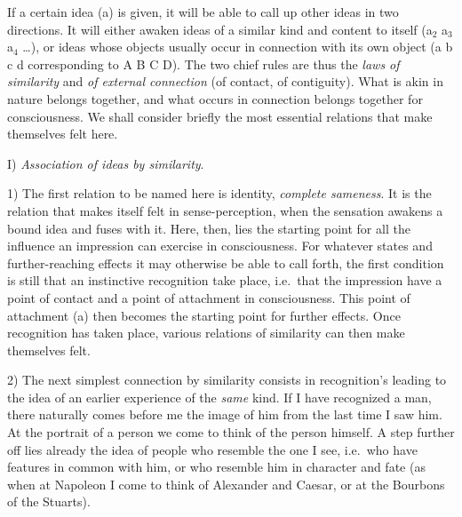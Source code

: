 \documentclass[12pt,a4paper]{book}
\newcommand{\opage}[1]{\marginnote{\footnotesize\textit{[#1]}}}
\begin{document}
If a certain idea (a) is given, it will be able to call up other ideas in
two directions. It will either awaken ideas of a similar kind and content
to itself (a$_{2}$ a$_{3}$ a$_{4}$ \ldots), or ideas whose objects usually
occur in connection with its own object (a b c d corresponding to A B C
D). The two chief rules are thus the \emph{laws of similarity} and \emph{of
external connection} (of contact, of contiguity). What is akin in nature
belongs together, and what occurs in connection belongs together for
consciousness. We shall consider briefly the most essential relations that
make themselves felt here.

I) \emph{Association of ideas by similarity}.

1) The first relation to be named here is identity, \emph{complete
sameness}. It is the relation that makes itself felt in sense-perception,
when the sensation awakens a bound idea and fuses with it. Here, then,
lies the starting point for all the influence an impression can exercise
in consciousness. For whatever states and further-reaching effects it may
otherwise be able to call forth, the first condition is still that an
instinctive recognition take place, i.e.\ that the impression have a point
of contact and a point of attachment in consciousness. This point of
attachment (a) then becomes the starting point for further effects. Once
recognition has taken place, various relations of similarity can then
make themselves felt.

2) The next simplest connection by similarity consists in recognition's
leading to the idea of an earlier experience of the \emph{same} kind. If I
have recognized a man, there naturally comes
\opage{188}before me the image of him from the last time I saw him. At the
portrait of a person we come to think of the person himself. A step
further off lies already the idea of people who resemble the one I see,
i.e.\ who have features in common with him, or who resemble him in
character and fate (as when at Napoleon I come to think of Alexander and
Caesar, or at the Bourbons of the Stuarts).
\end{document}
